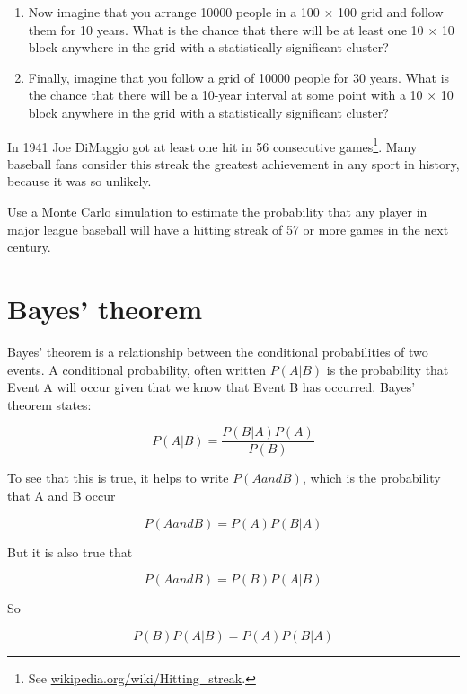 \documentclass[10pt]{book}
\begin{document}
\begin{ex}
\begin{enumerate}
\item Now imagine that you arrange 10000 people in a 100 $\times$ 100
  grid and follow them for 10 years.  What is the chance that there
  will be at least one 10 $\times$ 10 block anywhere in the grid
  with a statistically significant cluster?

\item Finally, imagine that you follow a grid of 10000 people for 30
  years.  What is the chance that there will be a 10-year interval
  at some point with a 10 $\times$ 10 block anywhere in the grid
  with a statistically significant cluster?

\end{enumerate}



\end{ex}


\begin{ex}

In 1941 Joe DiMaggio got at least one hit
in 56 consecutive games\footnote{See
  \url{wikipedia.org/wiki/Hitting_streak}.}.  Many baseball fans
consider this streak the greatest achievement in any sport in history,
because it was so unlikely.

Use a Monte Carlo simulation to estimate the probability that
any player in major league baseball will have a hitting streak
of 57 or more games in the next century.

\end{ex}



\section{Bayes' theorem}

Bayes' theorem is a relationship between the conditional probabilities
of two events.  A conditional probability, often written $P(A|B)$ is
the probability that Event A will occur given that we know that
Event B has occurred.  Bayes' theorem states:

\[ P(A|B) = \frac{P(B|A)P(A)}{P(B)} \]

To see that this is true, it helps to write $P(A and B)$, which
is the probability that A and B occur

\[ P(A and B) = P(A) P(B|A) \]

But it is also true that 
 
\[ P(A and B) = P(B) P(A|B) \]

So

\[ P(B) P(A|B) = P(A) P(B|A) \]
\end{document}
